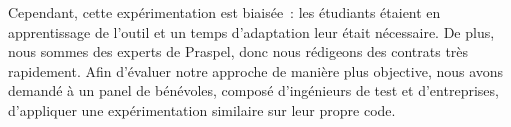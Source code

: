 Cependant, cette expérimentation est biaisée~: les étudiants étaient en
apprentissage de l'outil et un temps d'adaptation leur était nécessaire. De
plus, nous sommes des experts de Praspel, donc nous rédigeons des contrats très
rapidement. Afin d'évaluer notre approche de manière plus objective, nous avons
demandé à un panel de bénévoles, composé d'ingénieurs de test et d'entreprises,
d'appliquer une expérimentation similaire sur leur propre code.
